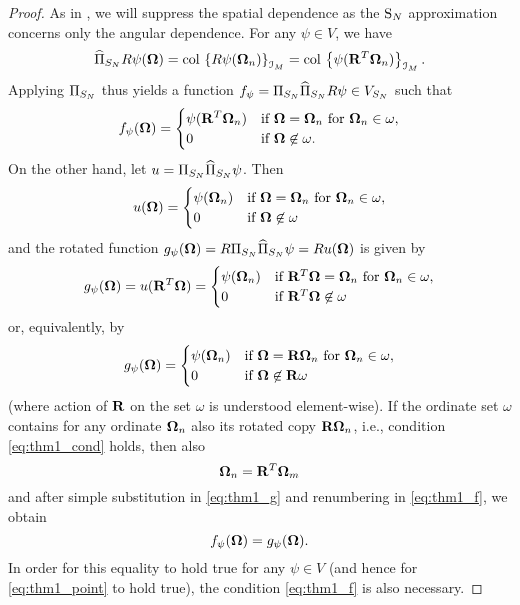 \begin{proof}
As in , we will suppress the spatial dependence as the $\text{S}_{N}$ approximation concerns only the angular
dependence. For any $\psi\in V$, we have
\begin{equation*}
	\widehat\Pi_{S_N} R\psi(\mathbf{\Omega}) = \operatorname{col\,}\left\{R\psi(\mathbf{\Omega}_n)\right\}_{\mathcal{I}_{M}} = \operatorname{col\,}\left\{\psi(\mathbf{R}^T\mathbf{\Omega}_n)\right\}_{\mathcal{I}_{M}}.
\end{equation*}
Applying $\Pi_{S_N}$ thus yields a function $f_\psi = \Pi_{S_N}\widehat\Pi_{S_N} R\psi \in V_{S_N}$ such that
\begin{equation}\label{eq:thm1_f}
f_\psi(\mathbf{\Omega}) = \begin{cases}\displaystyle \psi(\mathbf{R}^T\mathbf{\Omega}_n) & \mbox{if $\mathbf{\Omega} = \mathbf{\Omega}_n$ for $\mathbf{\Omega}_n\in\omega$},\\ 0 & \mbox{if $\mathbf{\Omega} \not
	\in \omega$.} \end{cases}
\end{equation}
On the other hand, let $u = \Pi_{S_N}\widehat\Pi_{S_N}\psi$. Then
$$
u(\mathbf{\Omega}) = \begin{cases}\displaystyle \psi(\mathbf{\Omega}_n) & \mbox{if $\mathbf{\Omega} = \mathbf{\Omega}_n$ for $\mathbf{\Omega}_n\in\omega$},\\ 0 & \mbox{if $\mathbf{\Omega} \not
	\in \omega$} \end{cases}
$$ 
and the rotated function $g_\psi(\mathbf{\Omega}) = R\Pi_{S_N}\widehat\Pi_{S_N}\psi = R u(\mathbf{\Omega})$ is given by
$$
g_\psi(\mathbf{\Omega}) = u(\mathbf{R}^T\mathbf{\Omega}) = \begin{cases}\displaystyle \psi(\mathbf{\Omega}_n) & \mbox{if $\mathbf{R}^T\mathbf{\Omega} = \mathbf{\Omega}_n$ for
$\mathbf{\Omega}_n\in\omega$},\\ 0 & \mbox{if $\mathbf{R}^T\mathbf{\Omega} \not \in \omega$} \end{cases}
$$
or, equivalently, by
\begin{equation}\label{eq:thm1_g}
g_\psi(\mathbf{\Omega}) = \begin{cases}\displaystyle \psi(\mathbf{\Omega}_n) & \mbox{if $\mathbf{\Omega} = \mathbf{R}\mathbf{\Omega}_n$ for
$\mathbf{\Omega}_n\in\omega$},\\ 0 & \mbox{if $\mathbf{\Omega} \not \in \mathbf{R}\omega$} \end{cases}
\end{equation}
(where action of $\mathbf{R}$ on the set $\omega$ is understood element-wise). If the ordinate set $\omega$ contains for
any ordinate $\mathbf{\Omega}_n$ also its rotated copy $\mathbf{R}\mathbf{\Omega}_n$, i.e., condition \eqref{eq:thm1_cond} holds, then also
$$
	\mathbf{\Omega}_n = \mathbf{R}^T\mathbf{\Omega}_m
$$
and after simple substitution in \eqref{eq:thm1_g} and renumbering in \eqref{eq:thm1_f}, we obtain
$$
	f_\psi(\mathbf{\Omega}) = g_\psi(\mathbf{\Omega}).
$$
In order for this equality to hold true for any $\psi \in V$ (and hence for \eqref{eq:thm1_point} to hold true), the
condition \eqref{eq:thm1_f} is also necessary.
\end{proof}
